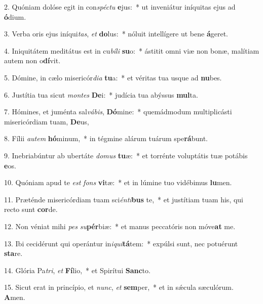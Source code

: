 2. Quóniam dolóse egit in con\textit{spéc}\textit{tu} \textbf{e}jus:~*  ut inveniátur iníquitas ejus ad \textbf{ó}dium.\

3. Verba oris ejus iníqui\textit{tas}, \textit{et} \textbf{do}lus:~*  nóluit intellígere ut bene \textbf{á}geret.\

4. Iniquitátem meditátus est in cu\textit{bí}\textit{li} \textbf{su}o:~*  ástitit omni viæ non bonæ, malítiam autem non o\textbf{dí}vit.\

5. Dómine, in cælo misericór\textit{di}\textit{a} \textbf{tu}a:~*  et véritas tua usque ad \textbf{nu}bes.\

6. Justítia tua sicut \textit{mon}\textit{tes} \textbf{De}i:~*  judícia tua abýssus \textbf{mul}ta.\

7. Hómines, et juménta sal\textit{vá}\textit{bis}, \textbf{Dó}mine:~*  quemádmodum multiplicásti misericórdiam tuam, \textbf{De}us,\

8. Fílii \textit{au}\textit{tem} \textbf{hó}minum,~*  in tégmine alárum tuárum spe\textbf{rá}bunt.\

9. Inebriabúntur ab ubertáte \textit{do}\textit{mus} \textbf{tu}æ:~*  et torrénte voluptátis tuæ potábis \textbf{e}os.\

10. Quóniam apud te \textit{est} \textit{fons} \textbf{vi}tæ:~*  et in lúmine tuo vidébimus \textbf{lu}men.\

11. Præténde misericórdiam tuam sci\textit{én}\textit{ti}\textbf{bus} te,~*  et justítiam tuam his, qui recto sunt \textbf{cor}de.\

12. Non véniat mihi \textit{pes} \textit{su}\textbf{pér}biæ:~*  et manus peccatóris non móve\textbf{at} me.\

13. Ibi cecidérunt qui operántur in\textit{i}\textit{qui}\textbf{tá}tem:~*  expúlsi sunt, nec potuérunt \textbf{sta}re.\

14. Glória Pa\textit{tri}, \textit{et} \textbf{Fí}lio,~*  et Spirítui \textbf{Sanc}to.\

15. Sicut erat in princípio, et \textit{nunc}, \textit{et} \textbf{sem}per,~*  et in sǽcula sæculórum. \textbf{A}men.\

